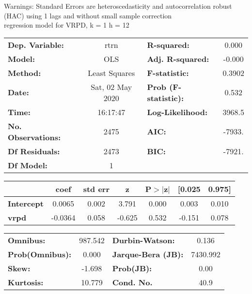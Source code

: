 Warnings: \newline
 [1] Standard Errors are heteroscedasticity and autocorrelation robust (HAC) using 1 lags and without small sample correction\\ 

regression model for VRPD, k = 1 h = 12\begin{center}
\begin{tabular}{lclc}
\toprule
\textbf{Dep. Variable:}    &       rtrn       & \textbf{  R-squared:         } &     0.000   \\
\textbf{Model:}            &       OLS        & \textbf{  Adj. R-squared:    } &    -0.000   \\
\textbf{Method:}           &  Least Squares   & \textbf{  F-statistic:       } &    0.3902   \\
\textbf{Date:}             & Sat, 02 May 2020 & \textbf{  Prob (F-statistic):} &    0.532    \\
\textbf{Time:}             &     16:17:47     & \textbf{  Log-Likelihood:    } &    3968.5   \\
\textbf{No. Observations:} &        2475      & \textbf{  AIC:               } &    -7933.   \\
\textbf{Df Residuals:}     &        2473      & \textbf{  BIC:               } &    -7921.   \\
\textbf{Df Model:}         &           1      & \textbf{                     } &             \\
\bottomrule
\end{tabular}
\begin{tabular}{lcccccc}
                   & \textbf{coef} & \textbf{std err} & \textbf{z} & \textbf{P$> |$z$|$} & \textbf{[0.025} & \textbf{0.975]}  \\
\midrule
\textbf{Intercept} &       0.0065  &        0.002     &     3.791  &         0.000        &        0.003    &        0.010     \\
\textbf{vrpd}      &      -0.0364  &        0.058     &    -0.625  &         0.532        &       -0.151    &        0.078     \\
\bottomrule
\end{tabular}
\begin{tabular}{lclc}
\textbf{Omnibus:}       & 987.542 & \textbf{  Durbin-Watson:     } &    0.136  \\
\textbf{Prob(Omnibus):} &   0.000 & \textbf{  Jarque-Bera (JB):  } & 7430.992  \\
\textbf{Skew:}          &  -1.698 & \textbf{  Prob(JB):          } &     0.00  \\
\textbf{Kurtosis:}      &  10.779 & \textbf{  Cond. No.          } &     40.9  \\
\bottomrule
\end{tabular}
\end{center}


